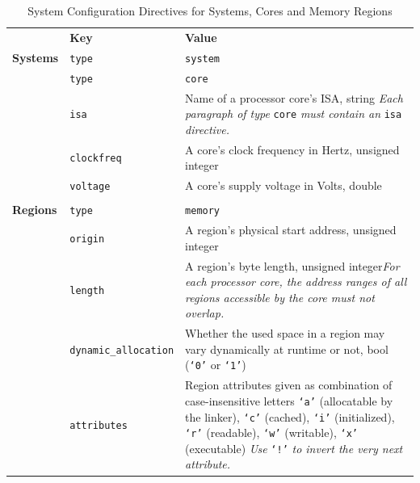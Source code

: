 \begin{table}[!ht]
  \begin{center}
    \caption{System Configuration Directives for Systems, Cores and Memory Regions}
    \label{tab:sysconf1}
    \begin{tabular}{|p{15mm}|p{33mm}|p{11.3cm}|}
      \hline
      & \textbf{Key} & \textbf{Value} \\
      \hhline{|=|=|=|}
      \textbf{Systems} & \small\texttt{type} & \small\texttt{system} \\
      \hhline{|=|=|=|}
      \multirow{4}{*}{\shortstack[l]{\textbf{Cores}}} & \small\texttt{type} & \small\texttt{core} \\
      \hhline{|~|-|-|}
      & \small\texttt{isa} & Name of a processor core's \gls{ISA}, string \newline \textit{Each paragraph of type} \texttt{\small core} \textit{must contain an} \texttt{\small isa} \textit{directive.} \\
      \hhline{|~|-|-|}
      & \small\texttt{clockfreq} & A core's clock frequency in Hertz, unsigned integer \\
      \hhline{|~|-|-|}
      & \small\texttt{voltage} & A core's supply voltage in Volts, double \\
      \hhline{|=|=|=|}
      \multirow{13}{*}{\shortstack[l]{\textbf{Memory} \\ \textbf{Regions}}} & \small\texttt{type} & \small\texttt{memory} \\
      \hhline{|~|-|-|}
      & \small\texttt{origin} & A region's physical start address, unsigned integer \\
      \hhline{|~|-|-|}
      & \small\texttt{length} & A region's byte length, unsigned integer\newline \textit{For each processor core, the address ranges of all regions accessible by the core must not overlap.} \\
      \hhline{|~|-|-|}
      & \small\texttt{dynamic\_allocation} & Whether the used space in a region may vary dynamically at runtime or not, bool (\texttt{`0'} or \texttt{`1'}) \\
      \hhline{|~|-|-|}
      & \small\texttt{attributes} & Region attributes given as combination of case-insensitive letters \texttt{`a'} (allocatable by the linker), \texttt{`c'} (cached), \texttt{`i'} (initialized), \texttt{`r'} (readable), \texttt{`w'} (writable), \texttt{`x'} (executable) \newline \textit{Use} \texttt{`!'} \textit{to invert the very next attribute.} \\

\end{tabular}
\end{center}
\end{table}
